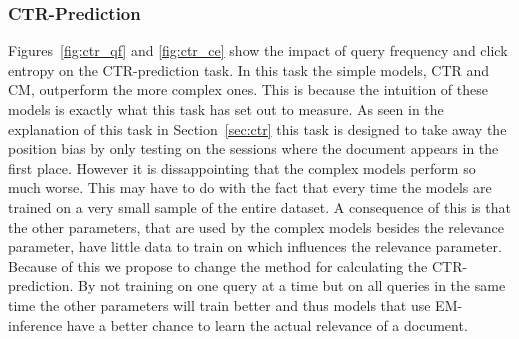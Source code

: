 \subsubsection{CTR-Prediction}
Figures~\ref{fig:ctr_qf} and \ref{fig:ctr_ce} show the impact of query frequency and click entropy on the CTR-prediction task. In this task the simple models, CTR and CM, outperform the more complex ones. This is because the intuition of these models is exactly what this task has set out to measure. As seen in the explanation of this task in Section~\ref{sec:ctr} this task is designed to take away the position bias by only testing on the sessions where the document appears in the first place. However it is dissappointing that the complex models perform so much worse. This may have to do with the fact that every time the models are trained on a very small sample of the entire dataset. A consequence of this is that the other parameters, that are used by the complex models besides the relevance parameter, have little data to train on which influences the relevance parameter. Because of this we propose to change the method for calculating the CTR-prediction. By not training on one query at a time but on all queries in the same time the other parameters will train better and thus models that use EM-inference have a better chance to learn the actual relevance of a document.

